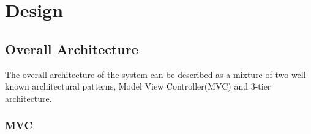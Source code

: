 \chapter{Design}




 


\section{Overall Architecture}

The overall architecture of the system can be described as a mixture of two well known architectural patterns, Model View Controller(MVC) and 3-tier architecture. 

\subsection{MVC}\label{sec_mvc}


